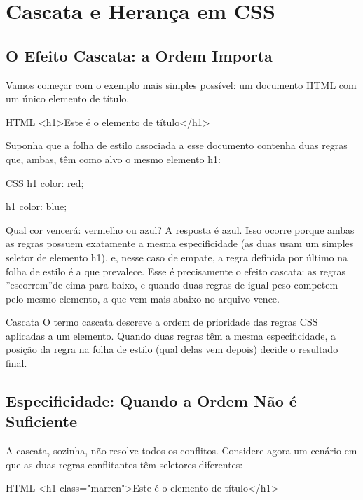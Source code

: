 \chapter{Cascata e Herança em CSS}

\section{O Efeito Cascata: a Ordem Importa}

Vamos começar com o exemplo mais simples possível: um documento HTML com um único elemento de título.

\begin{codebox}{HTML}
<h1>Este é o elemento de título</h1>
\end{codebox}

Suponha que a folha de estilo associada a esse documento contenha duas regras que, ambas, têm como alvo o mesmo elemento h1:

\begin{codebox}{CSS}
h1 {
  color: red;
}

h1 {
  color: blue;
}
\end{codebox}

Qual cor vencerá: vermelho ou azul? A resposta é azul. Isso ocorre porque ambas as regras possuem exatamente a mesma especificidade (as duas usam um simples seletor de elemento h1), e, nesse caso de empate, a regra definida por último na folha de estilo é a que prevalece. Esse é precisamente o efeito cascata: as regras ”escorrem”de cima para baixo, e quando duas regras de igual peso competem pelo mesmo elemento, a que vem mais abaixo no arquivo vence.

\begin{infobox}{Cascata}
O termo cascata descreve a ordem de prioridade das regras CSS aplicadas a um elemento. Quando duas regras têm a mesma especificidade, a posição da regra na folha de estilo (qual delas vem depois) decide o resultado final.
\end{infobox}

\section{Especificidade: Quando a Ordem Não é Suficiente}

A cascata, sozinha, não resolve todos os conflitos. Considere agora um cenário em que as duas regras conflitantes têm seletores diferentes:

\begin{codebox}{HTML}
 <h1 class="marren">Este é o elemento de título</h1>
\end{codebox}


